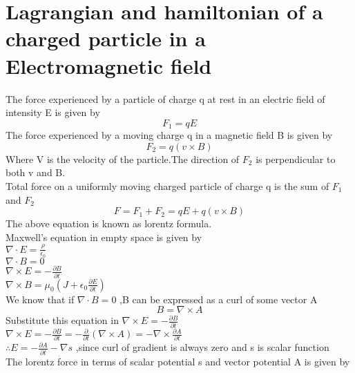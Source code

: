




























\newpage
\section{Lagrangian and hamiltonian of a charged particle in a Electromagnetic field}
The force experienced by a particle of charge q at rest in an electric field of intensity E is given by
$$F_1=qE$$
The force experienced by a moving charge q in a magnetic field B is given by\\
$$F_2=q(v\times B)$$
Where V  is the velocity of the particle.The direction of $F_2$ is perpendicular to both v and B.\\
Total force on a uniformly moving charged particle of charge q is the sum of $F_1$ and $F_2$\\
$$F=F_1+F_2=qE+q(v\times B)$$
The above equation is known as lorentz formula.\\
Maxwell's equation in empty space is given by\\
$\nabla \cdot E=\frac{\rho}{\epsilon_0}$\\
$\nabla \cdot B=0$\\
$\nabla \times E=-\frac{\partial B}{\partial t}$\\
$\nabla \times B=\mu_0(J+\epsilon_0\frac{\partial E}{\partial t})$\\
We know that if $\nabla \cdot B=0$ ,B can be expressed as a curl of some vector A\\
$$B=\nabla \times A$$
Substitute this equation in $\nabla \times E=-\frac{\partial B}{\partial t}$\\
$\nabla \times E=-\frac{\partial B}{\partial t}=-\frac{\partial}{\partial t}(\nabla \times A)=-\nabla \times \frac{\partial A}{\partial t}$\\
$\therefore E=-\frac{\partial A}{\partial t}-\nabla s$ ,since curl of gradient is always zero and s is  scalar function\\
The lorentz force in terms of scalar potential s and vector potential A is given by\\
